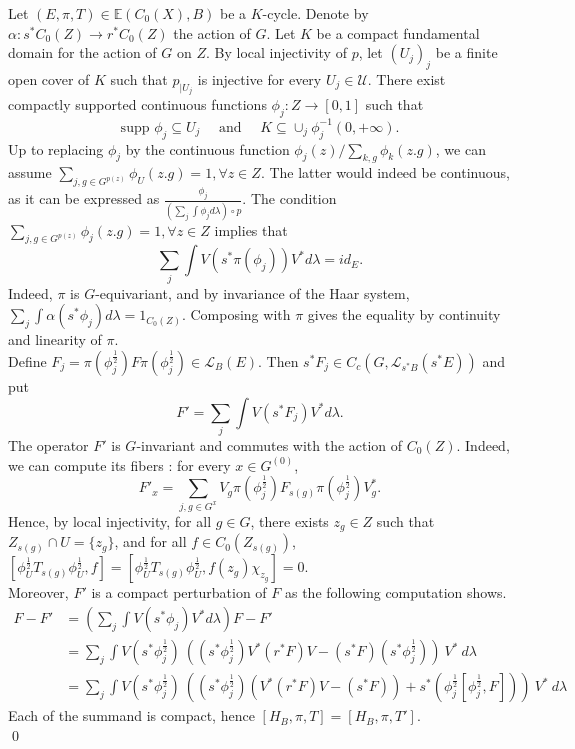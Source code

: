 \begin{dem}
Let $(E,\pi,T)\in \mathbb E(C_0(X),B)$ be a $K$-cycle. Denote by $\alpha : s^* C_0(Z) \rightarrow r^*C_0(Z)$ the action of $G$. Let $K$ be a compact fundamental domain for the action of $G$ on $Z$. By local injectivity of $p$, let $(U_j)_j$ be a finite open cover of $K$ such that $p_{|U_j}$ is injective for every $U_j\in \mathcal U$. There exist compactly supported continuous functions $\phi_j : Z\rightarrow [0,1]$ such that  \[\text{supp }\phi_j \subseteq U_j \quad\text{ and }\quad K\subseteq \cup_{j} \phi_j^{-1}(0,+\infty).\]
Up to replacing $\phi_j$ by the continuous function $\phi_j(z) / \sum_{k,g} \phi_k(z.g)$, we can assume $\sum_{j,g\in G^{p(z)}} \phi_U (z.g) = 1,\forall z\in Z$. The latter would indeed be continuous, as it can be expressed as $\frac{\phi_j} {(\sum_j\int \phi_j d\lambda ) \circ p }$. The condition $\sum_{j,g\in G^{p(z)}} \phi_j (z.g) = 1,\forall z\in Z$ implies that 
\[\sum_j \int V(s^*\pi(\phi_j))V^*d\lambda = id_E.\] 
Indeed, $\pi$ is $G$-equivariant, and by invariance of the Haar system, $\sum_j\int \alpha(s^*\phi_j)d\lambda = 1_{C_0(Z)}$. Composing with $\pi$ gives the equality by continuity and linearity of $\pi$.\\  

Define $F_j = \pi(\phi_j^\frac{1}{2}) F \pi(\phi_j^\frac{1}{2})\in\mathcal L_B(E)$. Then $s^* F_j\in C_c(G,\mathcal L_{s^* B}(s^* E))$ and put
\[F'= \sum_{j} \int V (s^*F_j) V^* d\lambda.\] 
The operator $F'$ is  $G$-invariant and commutes with the action of $C_0(Z)$. Indeed, we can compute its fibers : for every $x\in G^{(0)}$,
\[F'_x = \sum_{j, g\in G^x} V_g\pi(\phi_j^{\frac{1}{2}}) F_{s(g)}\pi(\phi_j^{\frac{1}{2}})V_g^*.\] 
Hence, by local injectivity, for all $g\in G$, there exists $z_g\in Z$ such that $Z_{s(g)}\cap U = \{z_g\}$, and for all $f\in C_0(Z_{s(g)})$, $[ \phi_U^{\frac{1}{2}} T_{s(g)} \phi_U^{\frac{1}{2}},f ] = [ \phi_U^{\frac{1}{2}} T_{s(g)} \phi_U^{\frac{1}{2}},f(z_g) \chi_{z_g} ]=0 $.\\

Moreover, $F'$ is a compact perturbation of $F$ as the following computation shows.\\
\[\begin{array}{rl}
F -F' 	& = (\sum_{j} \int V (s^* \phi_j) V^*d\lambda)F -F' \\
		& = \sum_{j}\int V (s^*\phi_j^{\frac{1}{2}}) \ 
\left( (s^*\phi_j^\frac{1}{2}) V^* (r^*F) V- (s^*F)(s^*\phi_j^\frac{1}{2}) \right) \ V^* \ d\lambda\\
		& = \sum_{j} \int V (s^*\phi_j^{\frac{1}{2}}) \ 
			\left( (s^*\phi_j^\frac{1}{2}) (V^* (r^*F)V - (s^*F)) + s^*(\phi_j^\frac{1}{2} [\phi_j^\frac{1}{2},F] )\right) \ 
				V^* \ d\lambda	  	
\end{array}\]
Each of the summand is compact, hence $[H_B, \pi,T]=[H_B,\pi,T']$.\\ 
\qed
\end{dem}

